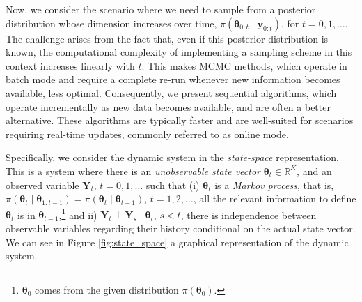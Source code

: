 Now, we consider the scenario where we need to sample from a posterior distribution whose dimension increases over time, $\pi(\bm{\theta}_{0:t}\mid \bm{y}_{0:t})$, for $t = 0, 1, \dots$. The challenge arises from the fact that, even if this posterior distribution is known, the computational complexity of implementing a sampling scheme in this context increases linearly with $t$. This makes MCMC methods, which operate in batch mode and require a complete re-run whenever new information becomes available, less optimal. Consequently, we present sequential algorithms, which operate incrementally as new data becomes available, and are often a better alternative. These algorithms are typically faster and are well-suited for scenarios requiring real-time updates, commonly referred to as online mode.

Specifically, we consider the dynamic system in the \textit{state-space} representation. This is a system where there is an \textit{unobservable state vector} $\bm{\theta}_t\in\mathbb{R}^K$, and an observed variable $\bm{Y}_t$, $t=0,1,\dots$ such that (i) $\bm{\theta}_t$ is a \textit{Markov process}, that is, $\pi(\bm{\theta}_{t}\mid \bm{\theta}_{1:t-1})=\pi(\bm{\theta}_{t}\mid \bm{\theta}_{t-1})$, $t=1,2,\dots$, all the relevant information to define $\bm{\theta}_{t}$ is in $\bm{\theta}_{t-1}$,\footnote{$\bm{\theta}_{0}$ comes from the given distribution $\pi(\bm{\theta}_{0})$.} and ii) $\bm{Y}_t\perp \bm{Y}_s\mid \bm{\theta}_{t}$, $s<t$, there is independence between observable variables regarding their history conditional on the actual state vector. We can see in Figure \ref{fig:state_space} a graphical representation of the dynamic system.
